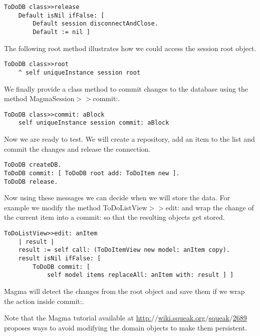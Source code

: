 \documentclass[a4paper,10pt,twoside]{book}
\newcommand{\ct}[1]{{\small\ttfamily\textup{#1}}}
\begin{document}
\begin{lstlisting}
ToDoDB class>>release
    Default isNil ifFalse: [
        Default session disconnectAndClose.
        Default := nil ]
\end{lstlisting}

The following \ct{root} method illustrates how we could access the session root object.

\begin{lstlisting}
ToDoDB class>>root
    ^ self uniqueInstance session root
\end{lstlisting}

We finally provide a class method to commit changes to the database using the method \ct{MagmaSession$>$$>$commit:}.

\begin{lstlisting}
ToDoDB class>>commit: aBlock
    self uniqueInstance session commit: aBlock
\end{lstlisting}

Now we are ready to test. We will create a repository, add an item to
the list and commit the changes and release the connection.

\begin{lstlisting}
ToDoDB createDB.
ToDoDB commit: [ ToDoDB root add: ToDoItem new ].
ToDoDB release.
\end{lstlisting}

Now using these messages we can decide when we will store the data. For example we modify the method \ct{ToDoListView$>$$>$edit:} and wrap the change of the current item into a \ct{commit:} so that the resulting
objects get stored.

\begin{lstlisting}
ToDoListView>>edit: anItem
    | result |
    result := self call: (ToDoItemView new model: anItem copy).
    result isNil ifFalse: [ 
        ToDoDB commit: [
            self model items replaceAll: anItem with: result ] ]
\end{lstlisting}

Magma will detect the changes from the root object and save them if we wrap the action inside \ct{commit:}.

Note that the Magma tutorial available at \href{http://wiki.squeak.org/squeak/2689}{http:$/$$/$wiki.squeak.org$/$squeak$/$2689} proposes ways to avoid modifying the domain objects to make them persistent.
\end{document}
